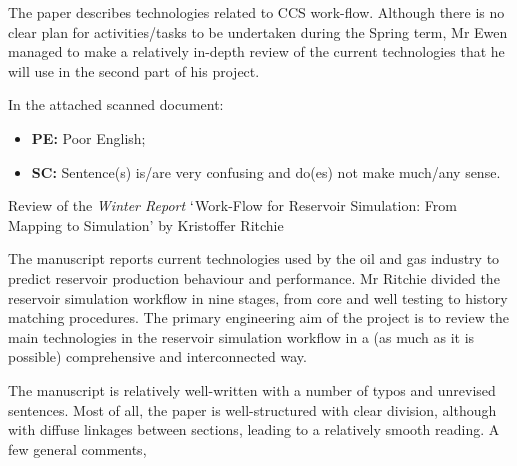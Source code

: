 \documentclass[14pt,twoside]{report}
\begin{document}
The paper describes technologies related to CCS work-flow. Although there is no clear plan for activities/tasks to be undertaken during the Spring term, Mr Ewen managed to make a relatively in-depth review of the current technologies that he will use in the second part of his project.

In the attached scanned document:
\begin{itemize}
\item {\bf PE:} Poor English;
\item {\bf SC:} Sentence(s) is/are very confusing and do(es) not make much/any sense.   
\end{itemize}
\medskip





\clearpage


\bigskip

\begin{center}
  {\Large Review of the {\it Winter Report} $\lq$Work-Flow for Reservoir Simulation: From Mapping to Simulation' by Kristoffer Ritchie}
\end{center}

The manuscript reports current technologies used by the oil and gas industry to predict reservoir production behaviour and performance. Mr Ritchie divided the reservoir simulation workflow in nine stages, from core and well testing to history matching procedures. The primary engineering aim of the project is to review the main technologies in the reservoir simulation workflow in a (as much as it is possible) comprehensive and interconnected way. 

The manuscript is relatively well-written with a number of typos and unrevised sentences. Most of all, the paper is well-structured with clear division, although with diffuse linkages between sections, leading to a relatively smooth reading. A few general comments,
\end{document}

